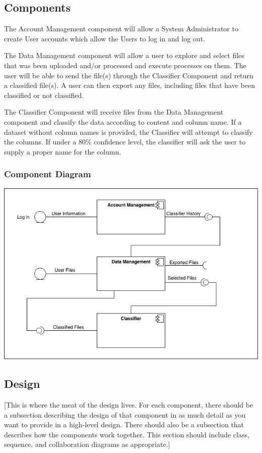 \documentclass[12pt,oneside,letterpaper]{article}
\begin{document}
\subsection{Components}
The Account Management component will allow a System Administrator to create User accounts which allow the Users to log in and log out.

The Data Management component will allow a user to explore and select files that was been uploaded and/or processed and execute processes on them. The user will be able to send the file(s) through the Classifier Component and return a classified file(s). A user can then export any files, including files that have been classified or not classified.

The Classifier Component will receive files from the Data Management component and classify the data according to content and column name. If a dataset without column names is provided, the Classifier will attempt to classify the columns. If under a 80\% confidence level, the classifier will ask the user to supply a proper name for the column.
\subsubsection{Component Diagram}
\includegraphics[scale = 0.7]{Component_Diagram.png}
\begingroup
{}
\endgroup


\subsection{Design}
[This is where the meat of the design lives.  For each component, there should be a subsection describing the design of that component in as much detail as you want to provide in a high-level design.  There should also be a subsection that describes how the components work together. This section should include class, sequence, and collaboration diagrams as appropriate.]
\end{document}
